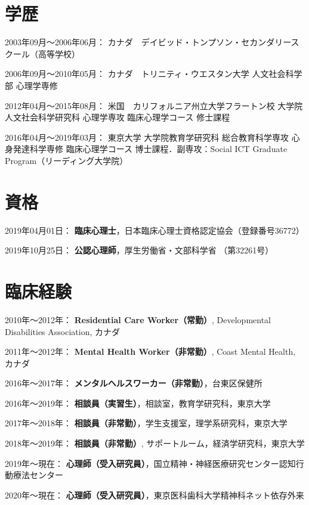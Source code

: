 \documentclass[11pt,a4paper]{article}
\begin{document}
\section{学歴}
\begin{description}
	\item 2003年09月～2006年06月： カナダ　デイビッド・トンプソン・セカンダリースクール（高等学校）
	\item 2006年09月～2010年05月： カナダ　トリニティ・ウエスタン大学 人文社会科学部 心理学専修
	\item 2012年04月～2015年08月： 米国　カリフォルニア州立大学フラートン校 大学院人文社会科学研究科 心理学専攻 臨床心理学コース 修士課程
	\item 2016年04月～2019年03月： 東京大学 大学院教育学研究科 総合教育科学専攻 心身発達科学専修 臨床心理学コース 博士課程．副専攻：Social ICT Graduate Program（リーディング大学院）
\end{description}
\section{資格}
\begin{description}
	\item 2019年04月01日： \textbf{臨床心理士}，日本臨床心理士資格認定協会（登録番号36772）
	\item 2019年10月25日： \textbf{公認心理師}，厚生労働省・文部科学省 （第32261号）
\end{description}

\section{臨床経験}
	\begin{description}
	\item 2010年〜2012年： \textbf{Residential Care Worker（常勤）}, Developmental Disabilities Association, カナダ
	\item 2011年〜2012年： \textbf{Mental Health Worker（非常勤）}, Coast Mental Health, カナダ
	\item 2016年〜2017年： \textbf{メンタルヘルスワーカー（非常勤）}，台東区保健所
	\item 2016年〜2019年： \textbf{相談員（実習生）}，相談室，教育学研究科，東京大学
	\item 2017年〜2018年： \textbf{相談員（非常勤）}，学生支援室，理学系研究科，東京大学
	\item 2018年〜2019年： \textbf{相談員（非常勤）}, サポートルーム，経済学研究科，東京大学
	\item 2019年〜現在： \textbf{心理師（受入研究員）}，国立精神・神経医療研究センター認知行動療法センター
	\item 2020年〜現在： \textbf{心理師（受入研究員）}，東京医科歯科大学精神科ネット依存外来
	\end{description}
\end{document}

